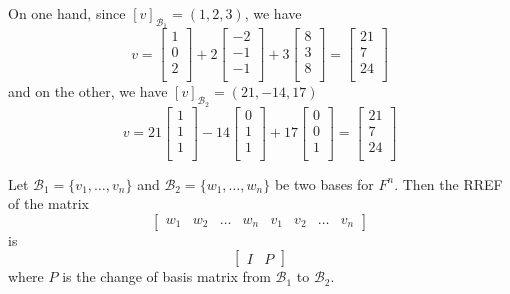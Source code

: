 \documentclass{article}
\begin{document}
\begin{example}
  On one hand, since $[v]_{\mathcal{B}_1} = (1, 2, 3)$, we have \[
    v =
    \begin{bmatrix}
      1 \\0\\2\\
    \end{bmatrix} + 2
    \begin{bmatrix}
      -2 \\-1\\-1\\
    \end{bmatrix} + 3
    \begin{bmatrix}
      8 \\3\\8\\
    \end{bmatrix} =
    \begin{bmatrix}
      21 \\7\\24\\
    \end{bmatrix}
  \] and on the other, we have $[v]_{\mathcal{B}_2} = (21, -14, 17)$ \[
    v = 21
    \begin{bmatrix}
      1 \\1\\1\\
    \end{bmatrix} -14
    \begin{bmatrix}
      0 \\1\\1\\
    \end{bmatrix} + 17
    \begin{bmatrix}
      0 \\0\\1\\
    \end{bmatrix} =
    \begin{bmatrix}
      21 \\7\\24\\
    \end{bmatrix}
  \]
\end{example}
\begin{theorem}
  Let $\mathcal{B}_1 = \{v_1, \ldots, v_n\}$ and $\mathcal{B}_2 = \{w_1, \ldots, w_n\}$ be two bases for $F^n$. Then the RREF of the matrix \[
    \left[
      \begin{array}{cccc|cccc}
        w_1 & w_2 & \dots & w_n & v_1 & v_2 & \dots & v_n
      \end{array}\right]
  \] is \[
    \left[
      \begin{array}{c|c}
        I & P
      \end{array}\right]
  \]
  where $P$ is the change of basis matrix from $\mathcal{B}_1$ to $\mathcal{B}_2$.
\end{theorem}
\end{document}
